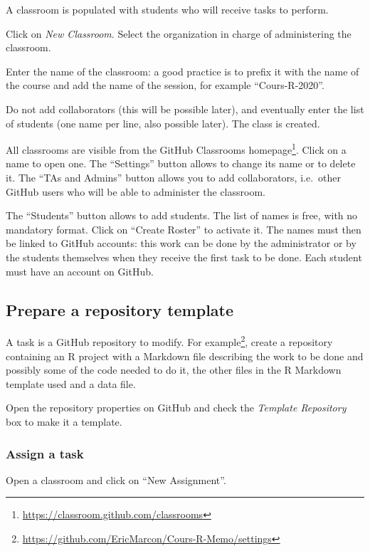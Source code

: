 \documentclass[
  12pt,
  american,
  a4paper,
  extrafontsizes,onecolumn,openright
  ]{memoir}
\newlength{\rf}
\begin{document}
A classroom is populated with students who will receive tasks to perform.

Click on \emph{New Classroom}.
Select the organization in charge of administering the classroom.

Enter the name of the classroom: a good practice is to prefix it with the name of the course and add the name of the session, for example \enquote{Cours-R-2020}.

Do not add collaborators (this will be possible later), and eventually enter the list of students (one name per line, also possible later).
The class is created.

All classrooms are visible from the GitHub Classrooms homepage\footnote{\url{https://classroom.github.com/classrooms}}.
Click on a name to open one.
The \enquote{Settings} button allows to change its name or to delete it.
The \enquote{TAs and Admins} button allows you to add collaborators, i.e.~other GitHub users who will be able to administer the classroom.

The \enquote{Students} button allows to add students.
The list of names is free, with no mandatory format.
Click on \enquote{Create Roster} to activate it.
The names must then be linked to GitHub accounts: this work can be done by the administrator or by the students themselves when they receive the first task to be done.
Each student must have an account on GitHub.

\subsection{Prepare a repository template}\label{prepare-a-repository-template}

A task is a GitHub repository to modify.
For example\footnote{\url{https://github.com/EricMarcon/Cours-R-Memo/settings}}, create a repository containing an R project with a Markdown file describing the work to be done and possibly some of the code needed to do it, the other files in the R Markdown template used and a data file.

Open the repository properties on GitHub and check the \emph{Template Repository} box to make it a template.

\subsubsection{Assign a task}\label{assign-a-task}

Open a classroom and click on \enquote{New Assignment}.
\end{document}
